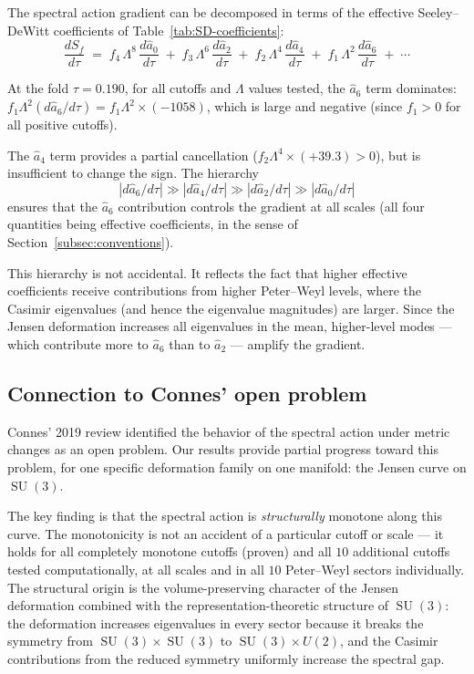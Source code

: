 \documentclass[12pt]{article}
\theoremstyle{definition}
\theoremstyle{remark}
\DeclareMathOperator{\SU}{SU}
\begin{document}
The spectral action gradient can be decomposed in terms of the
effective Seeley--DeWitt coefficients of
Table~\ref{tab:SD-coefficients}:
\begin{equation}\label{eq:gradient-decomp}
  \frac{dS_f}{d\tau} \;=\; f_4\, \Lambda^8\, \frac{d\hat a_0}{d\tau}
  \;+\; f_3\, \Lambda^6\, \frac{d\hat a_2}{d\tau}
  \;+\; f_2\, \Lambda^4\, \frac{d\hat a_4}{d\tau}
  \;+\; f_1\, \Lambda^2\, \frac{d\hat a_6}{d\tau}
  \;+\; \cdots
\end{equation}
{\sloppy At the fold $\tau = 0.190$, for all cutoffs and $\Lambda$ values
tested, the $\hat a_6$ term dominates:
$f_1 \Lambda^2 (d\hat a_6/d\tau) = f_1 \Lambda^2 \times (-1058)$, which is
large and negative (since $f_1 > 0$ for all positive cutoffs).\par}  The
$\hat a_4$ term provides a partial cancellation
($f_2 \Lambda^4 \times (+39.3) > 0$), but is insufficient to change
the sign.  The hierarchy
\begin{equation}
  |d\hat a_6/d\tau| \gg |d\hat a_4/d\tau| \gg |d\hat a_2/d\tau| \gg
  |d\hat a_0/d\tau|
\end{equation}
ensures that the $\hat a_6$ contribution controls the gradient at all
scales (all four quantities being effective coefficients, in the sense
of Section~\ref{subsec:conventions}).

This hierarchy is not accidental.  It reflects the fact that higher
effective coefficients receive contributions from higher Peter--Weyl
levels, where the Casimir eigenvalues (and hence the eigenvalue
magnitudes) are larger.  Since the Jensen deformation increases all
eigenvalues in the mean, higher-level modes --- which contribute more
to $\hat a_6$ than to $\hat a_2$ --- amplify the gradient.


\subsection{Connection to Connes' open problem}

Connes' 2019 review \cite{Connes2019} identified the
behavior of the spectral action under metric changes as an open
problem.  Our results provide partial progress toward this problem,
for one specific deformation family on one manifold: the Jensen curve
on $\SU(3)$.

The key finding is that the spectral action is \emph{structurally}
monotone along this curve.  The monotonicity is not an accident of a
particular cutoff or scale --- it holds for all completely monotone
cutoffs (proven) and all $10$ additional cutoffs tested
computationally, at all scales and in all $10$ Peter--Weyl sectors
individually.  The structural origin is the volume-preserving
character of the Jensen deformation combined with the
representation-theoretic structure of $\SU(3)$: the deformation
increases eigenvalues in every sector because it breaks the symmetry
from $\SU(3) \times \SU(3)$ to $\SU(3) \times U(2)$, and the
Casimir contributions from the reduced symmetry uniformly increase
the spectral gap.
\end{document}
